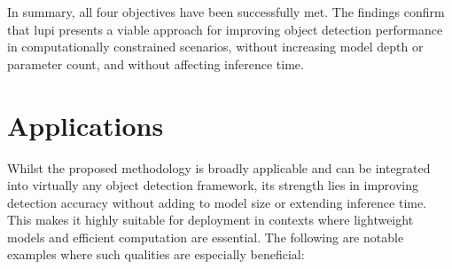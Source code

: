 In summary, all four objectives have been successfully met. The findings confirm that \gls{lupi} presents a viable approach for improving object detection performance in computationally constrained scenarios, without increasing model depth or parameter count, and without affecting inference time.

\section{Applications}
\label{sec:6_applications}

Whilst the proposed methodology is broadly applicable and can be integrated into virtually any object detection framework, its strength lies in improving detection accuracy without adding to model size or extending inference time. This makes it highly suitable for deployment in contexts where lightweight models and efficient computation are essential. The following are notable examples where such qualities are especially beneficial:

